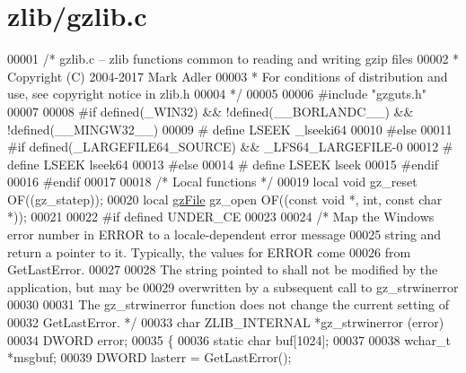 \hypertarget{zlib_2gzlib_8c_source}{}\section{zlib/gzlib.c}
\label{zlib_2gzlib_8c_source}

\begin{DoxyCode}
00001 \textcolor{comment}{/* gzlib.c -- zlib functions common to reading and writing gzip files}
00002 \textcolor{comment}{ * Copyright (C) 2004-2017 Mark Adler}
00003 \textcolor{comment}{ * For conditions of distribution and use, see copyright notice in zlib.h}
00004 \textcolor{comment}{ */}
00005 
00006 \textcolor{preprocessor}{#include "gzguts.h"}
00007 
00008 \textcolor{preprocessor}{#if defined(\_WIN32) && !defined(\_\_BORLANDC\_\_) && !defined(\_\_MINGW32\_\_)}
00009 \textcolor{preprocessor}{#  define LSEEK \_lseeki64}
00010 \textcolor{preprocessor}{#else}
00011 \textcolor{preprocessor}{#if defined(\_LARGEFILE64\_SOURCE) && \_LFS64\_LARGEFILE-0}
00012 \textcolor{preprocessor}{#  define LSEEK lseek64}
00013 \textcolor{preprocessor}{#else}
00014 \textcolor{preprocessor}{#  define LSEEK lseek}
00015 \textcolor{preprocessor}{#endif}
00016 \textcolor{preprocessor}{#endif}
00017 
00018 \textcolor{comment}{/* Local functions */}
00019 local \textcolor{keywordtype}{void} gz\_reset OF((gz\_statep));
00020 local \hyperlink{structgz_file__s}{gzFile} gz\_open OF((\textcolor{keyword}{const} \textcolor{keywordtype}{void} *, \textcolor{keywordtype}{int}, \textcolor{keyword}{const} \textcolor{keywordtype}{char} *));
00021 
00022 \textcolor{preprocessor}{#if defined UNDER\_CE}
00023 
00024 \textcolor{comment}{/* Map the Windows error number in ERROR to a locale-dependent error message}
00025 \textcolor{comment}{   string and return a pointer to it.  Typically, the values for ERROR come}
00026 \textcolor{comment}{   from GetLastError.}
00027 \textcolor{comment}{}
00028 \textcolor{comment}{   The string pointed to shall not be modified by the application, but may be}
00029 \textcolor{comment}{   overwritten by a subsequent call to gz\_strwinerror}
00030 \textcolor{comment}{}
00031 \textcolor{comment}{   The gz\_strwinerror function does not change the current setting of}
00032 \textcolor{comment}{   GetLastError. */}
00033 \textcolor{keywordtype}{char} ZLIB\_INTERNAL *gz\_strwinerror (error)
00034      DWORD error;
00035 \{
00036     \textcolor{keyword}{static} \textcolor{keywordtype}{char} buf[1024];
00037 
00038     \textcolor{keywordtype}{wchar\_t} *msgbuf;
00039     DWORD lasterr = GetLastError();

\end{DoxyCode}
